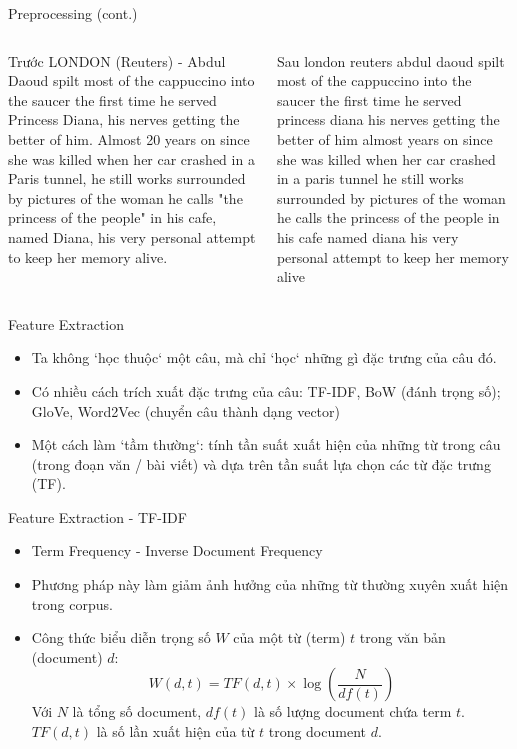 \documentclass[aspectratio=169,xcolor=dvipsnames]{beamer}
\begin{document}
\begin{frame}{Preprocessing (cont.)}
\begin{columns}[c] %

\begin{block}{Trước}
LONDON (Reuters) - Abdul Daoud spilt most of the cappuccino into the saucer the first time he served Princess Diana, his nerves getting the better of him. Almost 20 years on since she was killed when her car crashed in a Paris tunnel, he still works surrounded by pictures of the woman he calls "the princess of the people" in his cafe, named Diana, his very personal attempt to keep her memory alive.
\end{block}
\pause
{} %
\begin{block}{Sau}
london  reuters    abdul daoud spilt most of the cappuccino into the saucer the first time he served princess diana  his nerves getting the better of him  almost  years on since she was killed when her car crashed in a paris tunnel  he still works surrounded by pictures of the woman he calls  the princess of the people  in his cafe  named diana  his very personal attempt to keep her memory alive 
\end{block}
\end{columns}
\end{frame}

\begin{frame}{Feature Extraction}
\begin{itemize}
\item Ta không `học thuộc` một câu, mà chỉ `học` những gì đặc trưng của câu đó.
\item Có nhiều cách trích xuất đặc trưng của câu: TF-IDF, BoW (đánh trọng số); GloVe, Word2Vec (chuyển câu thành dạng vector)
\item Một cách làm `tầm thường`: tính tần suất xuất hiện của những từ trong câu (trong đoạn văn / bài viết) và dựa trên tần suất lựa chọn các từ đặc trưng (TF).
\end{itemize}
\end{frame}

\begin{frame}{Feature Extraction - TF-IDF}
\begin{itemize}
\item Term Frequency - Inverse Document Frequency
\item Phương pháp này làm giảm ảnh hưởng của những từ thường xuyên xuất hiện trong corpus.
\item Công thức biểu diễn trọng số $W$ của một từ (term) $t$ trong văn bản (document) $d$:
$$
W(d, t) = TF(d, t) \times \log\left(\frac{N}{df(t)}\right)
$$
Với $N$ là tổng số document, $df(t)$ là số lượng document chứa term $t$. $TF(d, t)$ là số lần xuất hiện của từ $t$ trong document $d$.
\end{itemize}
\end{frame}
\end{document}
